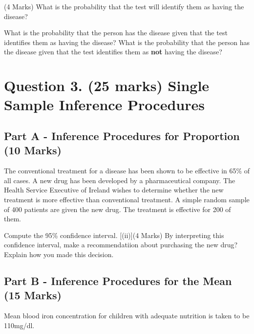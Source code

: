 \begin{enumerate}[(i)]
 (4 Marks) What is the probability that the test will identify them as having the disease?
	
  What is the probability that the person has the disease given that the test identifies them as having the disease?
  What is the probability that the person has the disease given that the test identifies them as \textbf{not} having the disease?
\end{enumerate}





\section*{Question 3. (25 marks) Single Sample Inference Procedures }

\subsection*{Part A - Inference Procedures for Proportion (10 Marks)}

The conventional treatment for a disease has been shown to be effective in 65\% of all 
cases. A new drug has been developed by a pharmaceutical company. The Health Service Executive of Ireland
wishes to determine whether the new treatment is more effective than conventional treatment. 
A simple random sample of 400 patients are given the new drug. The treatment is effective for 200 of them.


\begin{itemize}
[(i)] Compute the 95\% confidence interval.
[(ii)](4 Marks) By interpreting this confidence interval, make a recommendatiion about purchasing the new drug? Explain how you made this decision.
\end{itemize}

\subsection*{Part B - Inference Procedures for the Mean (15 Marks)}
Mean blood iron concentration for children with adequate nutrition is taken to be 110mg/dl. \\ \smallskip


